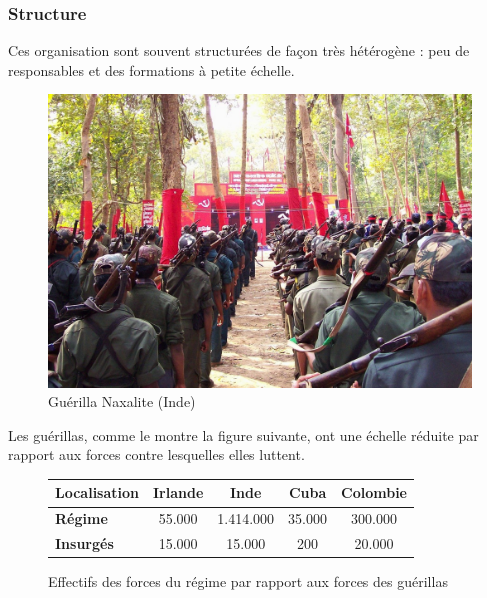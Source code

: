 \documentclass{article}
\begin{document}
\subsubsection{Structure}
Ces organisation sont souvent structurées de façon très hétérogène : peu de responsables et des formations à petite échelle.
\begin{figure}[H]
	\begin{centering}
	\includegraphics[width=\linewidth]{../ressources/guerrilla_naxalite}
	\caption{Guérilla Naxalite (Inde) \cite{guerrilla_naxalite}}
	\end{centering}
\end{figure}

Les guérillas, comme le montre la figure suivante, ont une échelle réduite par rapport aux forces contre lesquelles elles luttent.
\begin{figure}[H]
	\begin{centering}
	\begin{tabular}{| l | c | c | c | c |}
	\hline
	\textbf{Localisation}		& \textbf{Irlande} 	& \textbf{Inde} 	& \textbf{Cuba}	& \textbf{Colombie}	\\
	\hline
	\textbf{Régime}			& 55.000			& 1.414.000	& 35.000		& 300.000			\\
	\textbf{Insurgés}		& 15.000			& 15.000		& 200		& 20.000			\\
	\hline
	\end{tabular}
	\caption{Effectifs des forces du régime par rapport aux forces des guérillas \cite{naxalite_guerrilla_wiki, irish_civil_war_wiki}}
	\end{centering}
\end{figure}
\end{document}
